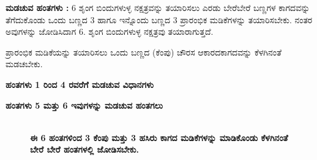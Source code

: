 \noindent
\textbf{ಮಡಚುವ ಹಂತಗಳು :} 6 ಶೃಂಗ ಬಿಂದುಗಳುಳ್ಳ ನಕ್ಷತ್ರವನ್ನು ತಯಾರಿಸಲು ಎರಡು ಬೇರೆ\break ಬೇರೆ ಬಣ್ಣಗಳ ಕಾಗದವನ್ನು ತೆಗೆದುಕೊಂಡು ಒಂದು ಬಣ್ಣದ 3 ಹಾಗೂ ಇನ್ನೊಂದು ಬಣ್ಣದ 3 ಪ್ರಾರಂಭಿಕ ಮಡಿಕೆಗಳನ್ನು ತಯಾರಿಸಬೇಕು. ನಂತರ ಅವುಗಳನ್ನು ಜೋಡಿಸಿದಾಗ 6. ಶೃಂಗ ಬಿಂದುಗಳುಳ್ಳ ನಕ್ಷತ್ರವು ತಯಾರಾಗುತ್ತದೆ. 
\begin{figure}[H]
\end{figure}

ಪ್ರಾರಂಭಿಕ ಮಡಿಕೆಯನ್ನು ತಯಾರಿಸಲು ಒಂದು ಬಣ್ಣದ (ಕೆಂಪು) ಚೌರಸ ಆಕಾರದ\break  ಕಾಗದವನ್ನು ಕೆಳಗಿನಂತೆ ಮಡಚಬೇಕು.

\textbf{ಹಂತಗಳು 1 ರಿಂದ 4 ರವರೆಗೆ ಮಡಚುವ ವಿಧಾನಗಳು}
\begin{figure}[H]
\end{figure}

\textbf{ಹಂತಗಳು 5 ಮತ್ತು 6 ಇವುಗಳನ್ನು ಮಡಚುವ ಹಂತಗಲು}
\begin{figure}[H]
\\
\textbf{ಈ 6 ಹಂತಗಳಿಂದ 3 ಕೆಂಪು ಮತ್ತು 3 ಹಸಿರು ಕಾಗದ ಮಡಿಕೆಗಳನ್ನು ಮಾಡಿಕೊಂಡು ಕೆಳಗಿನಂತೆ ಬೇರೆ ಬೇರೆ ಹಂತಗಳಲ್ಲಿ ಜೋಡಿಸಬೇಕು.}
\end{figure}
 
